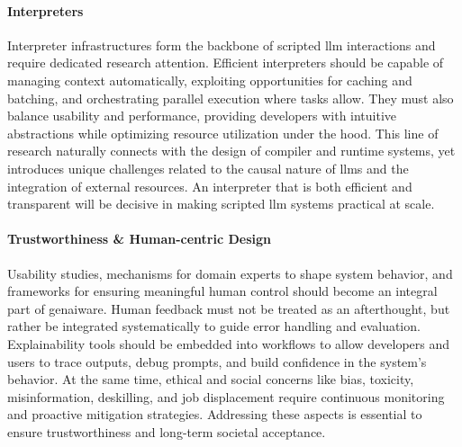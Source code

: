 \documentclass[manuscript,screen]{acmart}
\begin{document}
\paragraph{Interpreters}
Interpreter infrastructures form the backbone of scripted \ac{llm} interactions and require dedicated research attention.
Efficient interpreters should be capable of managing context automatically, exploiting opportunities for caching and batching, and orchestrating parallel execution where tasks allow.
They must also balance usability and performance, providing developers with intuitive abstractions while optimizing resource utilization under the hood.
This line of research naturally connects with the design of compiler and runtime systems, yet introduces unique challenges related to the causal nature of \acp{llm} and the integration of external resources.
An interpreter that is both efficient and transparent will be decisive in making scripted \ac{llm} systems practical at scale.

\paragraph{Trustworthiness \& Human-centric Design}
Usability studies, mechanisms for domain experts to shape system behavior, and frameworks for ensuring meaningful human control should become an integral part of \ac{genai}ware. %
Human feedback must not be treated as an afterthought, but rather be integrated systematically to guide error handling and evaluation.
Explainability tools should be embedded into workflows to allow developers and users to trace outputs, debug prompts, and build confidence in the system's behavior.
At the same time, ethical and social concerns like bias, toxicity, misinformation, deskilling, and job displacement require continuous monitoring and proactive mitigation strategies.
Addressing these aspects is essential to ensure trustworthiness and long-term societal acceptance.

\end{document}
